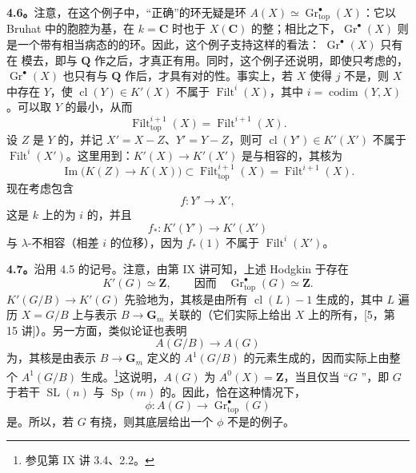 \textbf{4.6。}注意，在这个例子中，“正确”的环无疑是环 $A(X)\simeq\operatorname{Gr}_{\mathrm{top}}^\bullet(X)$：它以 Bruhat 中的胞腔为基，在 $k=\mathbf C$ 时也于 $X(\mathbf C)$ 的整；相比之下，$\operatorname{Gr}^\bullet(X)$ 则是一个带有相当病态的的环。因此，这个例子支持这样的看法： $\operatorname{Gr}^\bullet(X)$ 只有在
模去，即与 $\mathbf Q$ 作之后，才真正有用。同时，这个例子还说明，即使只考虑的，$\operatorname{Gr}^\bullet(X)$ 也只有与 $\mathbf Q$ 作后，才具有对的性。事实上，若 $X$ 使得 $j$ 不是，则 $X$ 中存在 $Y$，使 $\operatorname{cl}(Y)\in K'(X)$ 不属于 $\operatorname{Filt}^i(X)$，其中 $i=\operatorname{codim}(Y,X)$。可以取 $Y$ 的最小，从而
\[\operatorname{Filt}_{\mathrm{top}}^{i+1}(X)=\operatorname{Filt}^{i+1}(X).\]
设 $Z$ 是 $Y$ 的，并记 $X'=X-Z$、$Y'=Y-Z$，则可 $\operatorname{cl}(Y')\in K'(X')$ 不属于 $\operatorname{Filt}^i(X')$。这里用到：$K'(X)\to K'(X')$ 是与相容的，其核为
\[\operatorname{Im}\bigl(K(Z)\to K(X)\bigr)
\subset\operatorname{Filt}_{\mathrm{top}}^{i+1}(X)
=\operatorname{Filt}^{i+1}(X).\]
现在考虑包含
\[f:Y'\longrightarrow X',\]
这是 $k$ 上的为 $i$ 的，并且
\[f_*:K'(Y')\longrightarrow K'(X')\]
与 $\lambda$-不相容（相差 $i$ 的位移），因为 $f_*(1)$ 不属于 $\operatorname{Filt}^i(X')$。

\textbf{4.7。}沿用 4.5 的记号。注意，由第 IX 讲可知，上述 Hodgkin 于存在
\[K'(G)\simeq\mathbf Z,\qquad\text{因而}\quad
\operatorname{Gr}_{\mathrm{top}}^\bullet(G)\simeq\mathbf Z.\]
 $K'(G/B)\to K'(G)$ 先验地为，其核是由所有 $\operatorname{cl}(L)-1$ 生成的，其中 $L$ 遍历 $X=G/B$ 上与表示 $B\to\mathbf G_m$ 关联的（它们实际上给出 $X$ 上的所有，[5，第 15 讲]）。另一方面，类似论证也表明
\[A(G/B)\longrightarrow A(G)\]
为，其核是由表示 $B\to\mathbf G_m$ 定义的 $A^1(G/B)$ 的元素生成的，因而实际上由整个 $A^1(G/B)$ 生成。\footnote{参见第 IX 讲 3.4、2.2。}这说明，$A(G)$ 为 $A^0(X)=\mathbf Z$，当且仅当
“$G$ ”，即 $G$ 于若干 $\operatorname{SL}(n)$ 与 $\operatorname{Sp}(m)$ 的。因此，恰在这种情况下，
\[\phi:A(G)\longrightarrow\operatorname{Gr}_{\mathrm{top}}^\bullet(G)\]
是。所以，若 $G$ 有挠，则其底层给出一个 $\phi$ 不是的例子。

